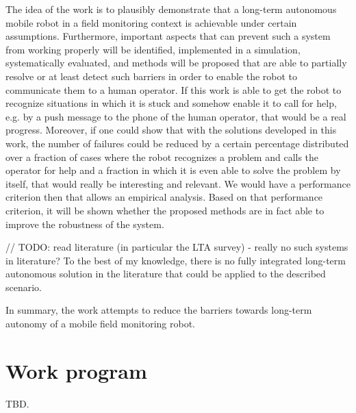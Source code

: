 \documentclass[german, master, expose, latin1]{base/thesis_KBS}
\begin{document}
The idea of the work is to plausibly demonstrate that a long-term autonomous mobile robot in a field monitoring context is achievable under certain assumptions.
Furthermore, important aspects that can prevent such a system from working properly will be identified, implemented in a simulation, systematically evaluated,
and methods will be proposed that are able to partially resolve or at least detect such barriers in order to enable the robot to communicate them to a human operator.
If this work is able to get the robot to recognize situations in which it is stuck and somehow enable it to call for help, e.g. by a push message to
the phone of the human operator, that would be a real progress. Moreover, if one could show that with the solutions developed in this work, the number of failures
could be reduced by a certain percentage distributed over a fraction of cases where the robot recognizes a problem and calls the operator for help and a fraction
in which it is even able to solve the problem by itself, that would really be interesting and relevant. We would have a performance criterion then that allows 
an empirical analysis. Based on that performance criterion, it will be shown whether the proposed methods are in fact able to improve the robustness of the system.\newline

// TODO: read literature (in particular the LTA survey) - really no such systems in literature?\newline
To the best of my knowledge, there is no fully integrated long-term autonomous solution in the literature that could be applied to the described scenario.\newline

In summary, the work attempts to reduce the barriers towards long-term autonomy of a mobile field monitoring robot.

\section{Work program}

TBD.


\end{document}
